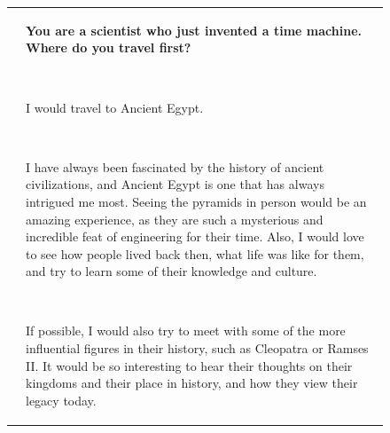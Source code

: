 \begin{figure}[p]
\begin{tabular}{@{}p{}p{}@{}}
    
    
    
    
    
    
    
    
    
    
    
    
    
    
    
    
    
    
    
    
    &
    
    \textcolor[HTML]{3078BE}{\textbf{You are a scientist who just invented a time machine. Where do you travel first?}}

    ~
    
    I would travel to Ancient Egypt.
    
    ~
    
    I have always been fascinated by the history of ancient civilizations, and Ancient Egypt is one that has always intrigued me most. Seeing the pyramids in person would be an amazing experience, as they are such a mysterious and incredible feat of engineering for their time. Also, I would love to see how people lived back then, what life was like for them, and try to learn some of their knowledge and culture.
    
    ~
    
    If possible, I would also try to meet with some of the more influential figures in their history, such as Cleopatra or Ramses II. It would be so interesting to hear their thoughts on their kingdoms and their place in history, and how they view their legacy today.
    

\end{tabular}
\end{figure}

